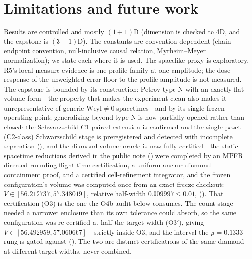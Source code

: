 \section{Limitations and future work}\label{sec:limitations}

Results are controlled and mostly $(1{+}1)$D (dimension is checked to 4D, and
the  capstone is $(3{+}1)$D). The constants are
convention-dependent (chain endpoint convention, null-inclusive causal
relation, Myrheim--Meyer normalization); we state each where it is used. The
spacelike proxy is exploratory. R5's local-measure evidence is one profile family at one amplitude; the dose-response of the unweighted error floor to the profile amplitude is not measured. The capstone is bounded by its construction:
Petrov type N with an exactly flat volume form---the property that makes the
experiment clean also makes it unrepresentative of generic
$\mathrm{Weyl} \ne 0$ spacetimes---and by its single frozen operating point;
generalizing beyond type N is now partially opened rather than closed: the
Schwarzschild C1-paired extension is confirmed and the single-poset
(C2-class) Schwarzschild stage is preregistered and detected with incomplete
separation (), and the diamond-volume oracle is now
fully certified---the static-spacetime reductions derived in the public note
() were
completed by an MPFR directed-rounding flight-time certification, a uniform
anchor-diamond containment proof, and a certified cell-refinement integrator,
and the frozen configuration's volume was computed once from an exact freeze
checkout: $V \in [56.212737, 57.348019]$, relative half-width
$0.009997 \le 0.01$, 
(). That certification
(O3) is the one the O4b audit below consumes. The  count
stage needed a narrower enclosure than its own tolerance could absorb, so the
same configuration was re-certified at half the target width (O3$'$), giving
$V \in [56.492959, 57.060667]$---strictly inside O3, and the interval the
$\mu = 0.1333$ rung is gated against
(). The two are
distinct certifications of the same diamond at different target widths, never
combined.

